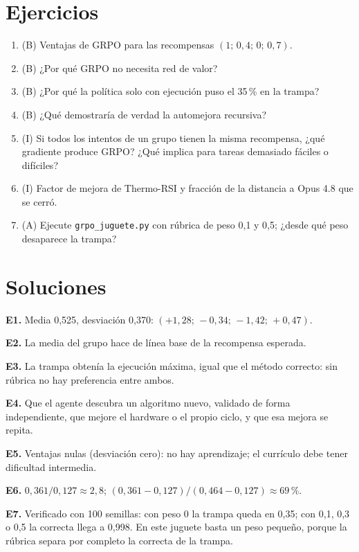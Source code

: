\documentclass[11pt,a4paper]{article}
\begin{document}
\section{Ejercicios}
\begin{enumerate}[label=\textbf{E\arabic*.}]
\item (B) Ventajas de GRPO para las recompensas $(1;\,0{,}4;\,0;\,0{,}7)$.
\item (B) ¿Por qué GRPO no necesita red de valor?
\item (B) ¿Por qué la política solo con ejecución puso el 35\,\% en la trampa?
\item (B) ¿Qué demostraría de verdad la automejora recursiva?
\item (I) Si todos los intentos de un grupo tienen la misma recompensa, ¿qué gradiente produce GRPO? ¿Qué implica para tareas demasiado fáciles o difíciles?
\item (I) Factor de mejora de Thermo-RSI y fracción de la distancia a Opus 4.8 que se cerró.
\item (A) Ejecute \texttt{grpo\_juguete.py} con rúbrica de peso 0{,}1 y 0{,}5; ¿desde qué peso desaparece la trampa?
\end{enumerate}
\section{Soluciones}
\begin{solucion}
\textbf{E1.} Media 0{,}525, desviación 0{,}370: $(+1{,}28;\,-0{,}34;\,-1{,}42;\,+0{,}47)$.

\textbf{E2.} La media del grupo hace de línea base de la recompensa esperada.

\textbf{E3.} La trampa obtenía la ejecución máxima, igual que el método correcto: sin rúbrica no hay preferencia entre ambos.

\textbf{E4.} Que el agente descubra un algoritmo nuevo, validado de forma independiente, que mejore el hardware o el propio ciclo, y que esa mejora se repita.

\textbf{E5.} Ventajas nulas (desviación cero): no hay aprendizaje; el currículo debe tener dificultad intermedia.

\textbf{E6.} $0{,}361/0{,}127\approx2{,}8$; $(0{,}361-0{,}127)/(0{,}464-0{,}127)\approx69\,\%$.

\textbf{E7.} Verificado con 100 semillas: con peso 0 la trampa queda en 0{,}35; con 0{,}1, 0{,}3 o 0{,}5 la correcta llega a 0{,}998. En este juguete basta un peso pequeño, porque la rúbrica separa por completo la correcta de la trampa.
\end{solucion}
\end{document}
